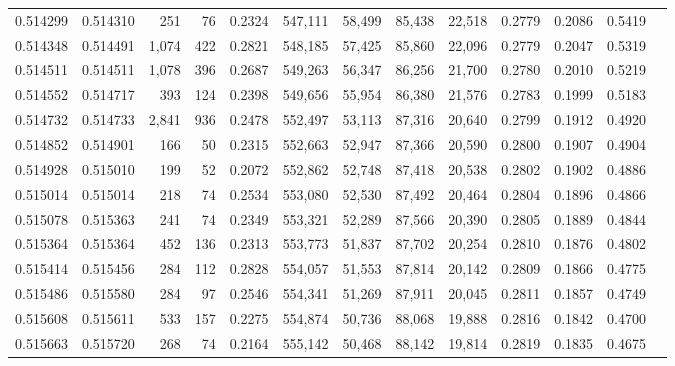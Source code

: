 \begin{tabular}{rrrrrrrrrrrrr}
0.514299 & 0.514310 &   251 &    76 &                                     0.2324 & 547,111 &  58,499 &  85,438 &  22,518 & 0.2779 & 0.2086 & 0.5419 \\
0.514348 & 0.514491 & 1,074 &   422 &                                     0.2821 & 548,185 &  57,425 &  85,860 &  22,096 & 0.2779 & 0.2047 & 0.5319 \\
0.514511 & 0.514511 & 1,078 &   396 &                                     0.2687 & 549,263 &  56,347 &  86,256 &  21,700 & 0.2780 & 0.2010 & 0.5219 \\
0.514552 & 0.514717 &   393 &   124 &                                     0.2398 & 549,656 &  55,954 &  86,380 &  21,576 & 0.2783 & 0.1999 & 0.5183 \\
0.514732 & 0.514733 & 2,841 &   936 &                                     0.2478 & 552,497 &  53,113 &  87,316 &  20,640 & 0.2799 & 0.1912 & 0.4920 \\
0.514852 & 0.514901 &   166 &    50 &                                     0.2315 & 552,663 &  52,947 &  87,366 &  20,590 & 0.2800 & 0.1907 & 0.4904 \\
0.514928 & 0.515010 &   199 &    52 &                                     0.2072 & 552,862 &  52,748 &  87,418 &  20,538 & 0.2802 & 0.1902 & 0.4886 \\
0.515014 & 0.515014 &   218 &    74 &                                     0.2534 & 553,080 &  52,530 &  87,492 &  20,464 & 0.2804 & 0.1896 & 0.4866 \\
0.515078 & 0.515363 &   241 &    74 &                                     0.2349 & 553,321 &  52,289 &  87,566 &  20,390 & 0.2805 & 0.1889 & 0.4844 \\
0.515364 & 0.515364 &   452 &   136 &                                     0.2313 & 553,773 &  51,837 &  87,702 &  20,254 & 0.2810 & 0.1876 & 0.4802 \\
0.515414 & 0.515456 &   284 &   112 &                                     0.2828 & 554,057 &  51,553 &  87,814 &  20,142 & 0.2809 & 0.1866 & 0.4775 \\
0.515486 & 0.515580 &   284 &    97 &                                     0.2546 & 554,341 &  51,269 &  87,911 &  20,045 & 0.2811 & 0.1857 & 0.4749 \\
0.515608 & 0.515611 &   533 &   157 &                                     0.2275 & 554,874 &  50,736 &  88,068 &  19,888 & 0.2816 & 0.1842 & 0.4700 \\
0.515663 & 0.515720 &   268 &    74 &                                     0.2164 & 555,142 &  50,468 &  88,142 &  19,814 & 0.2819 & 0.1835 & 0.4675 \\

\end{tabular}

